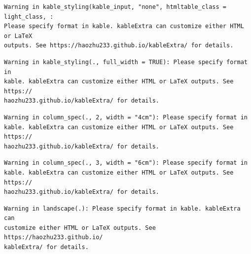 \documentclass[11pt,twoside]{bristolthesis}
\begin{document}
\begin{verbatim}
Warning in kable_styling(kable_input, "none", htmltable_class = light_class, :
Please specify format in kable. kableExtra can customize either HTML or LaTeX
outputs. See https://haozhu233.github.io/kableExtra/ for details.
\end{verbatim}
\begin{verbatim}
Warning in kable_styling(., full_width = TRUE): Please specify format in
kable. kableExtra can customize either HTML or LaTeX outputs. See https://
haozhu233.github.io/kableExtra/ for details.
\end{verbatim}
\begin{verbatim}
Warning in column_spec(., 2, width = "4cm"): Please specify format in
kable. kableExtra can customize either HTML or LaTeX outputs. See https://
haozhu233.github.io/kableExtra/ for details.
\end{verbatim}
\begin{verbatim}
Warning in column_spec(., 3, width = "6cm"): Please specify format in
kable. kableExtra can customize either HTML or LaTeX outputs. See https://
haozhu233.github.io/kableExtra/ for details.
\end{verbatim}
\begin{verbatim}
Warning in landscape(.): Please specify format in kable. kableExtra can
customize either HTML or LaTeX outputs. See https://haozhu233.github.io/
kableExtra/ for details.
\end{verbatim}
\end{document}
